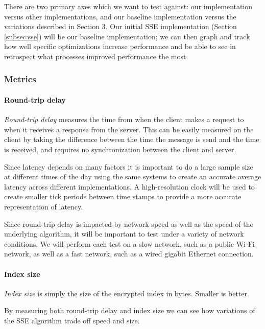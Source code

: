 \documentclass[onecolumn, draftclsnofoot,10pt, compsoc]{IEEEtran}
\begin{document}

There are two primary axes which we want to test against: our implementation versus other implementations, and our baseline implementation versus the variations described in Section 3.
Our initial SSE implementation (Section \ref{subsec:sse}) will be our baseline implementation;
we can then graph and track how well specific optimizations increase performance and be able to see in retrospect what processes improved performance the most.

\subsubsection {Metrics}

\paragraph {Round-trip delay}

\textit{Round-trip delay} measures the time from when the client makes a request to when it receives a response from the server.
This can be easily measured on the client by taking the difference between the time the message is send and the time is received, and requires no synchronization between the client and server.

Since latency depends on many factors it is important to do a large sample size at different times of the day using the same systems to create an accurate average latency across different implementations. 
A high-resolution clock will be used to create smaller tick periods between time stamps to provide a more accurate representation of latency. 

Since round-trip delay is impacted by network speed as well as the speed of the underlying algorithm, it will be important to test under a variety of network conditions.
We will perform each test on a slow network, such as a public Wi-Fi network, as well as a fast network, such as a wired gigabit Ethernet connection.

\paragraph {Index size} \textit{Index size} is simply the size of the encrypted index in bytes. Smaller is better.

By measuring both round-trip delay and index size we can see how variations of the SSE algorithm trade off speed and size.
\end{document}
